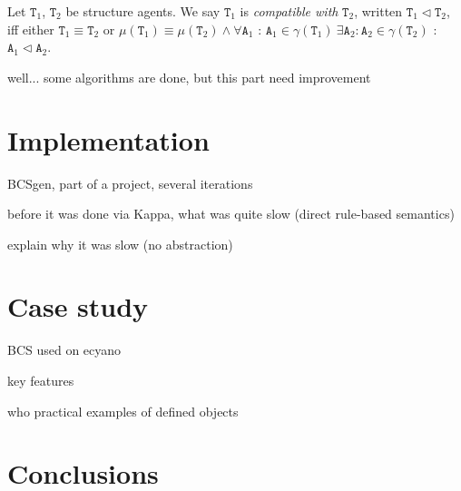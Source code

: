 \documentclass[12pt]{fithesis2}
\begin{document}
\begin{definition}
Let $\mathtt{T}_1$, $\mathtt{T}_2$ be structure agents. We say $\mathtt{T}_1$ is \emph{compatible with} $\mathtt{T}_2$, written $\mathtt{T}_1 \lhd \mathtt{T}_2$, iff either $\mathtt{T}_1 \equiv \mathtt{T}_2$ or $\mu(\mathtt{T}_1) \equiv \mu(\mathtt{T}_2) \wedge \forall \mathtt{A}_1$ : $\mathtt{A}_1 \in \gamma(\mathtt{T}_1) ~\exists \mathtt{A}_2 : \mathtt{A}_2 \in \gamma(\mathtt{T}_2)$ : $\mathtt{A}_1 \lhd \mathtt{A}_2$.
\end{definition}

well... some algorithms are done, but this part need improvement

\chapter{Implementation}

BCSgen, part of a project, several iterations

before it was done via Kappa, what was quite slow (direct rule-based semantics)

explain why it was slow (no abstraction)

\chapter{Case study}

BCS used on ecyano

key features

who practical examples of defined objects

\chapter{Conclusions}

\printbibliography
\end{document}

